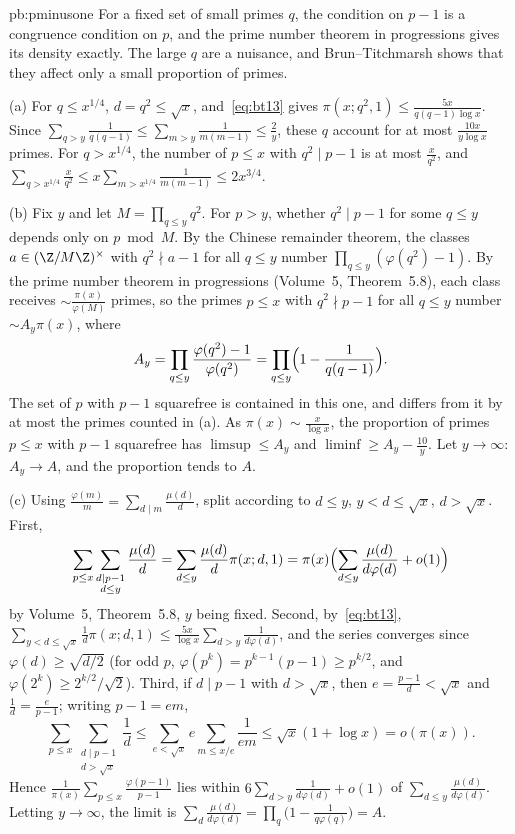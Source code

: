 \begin{solution}{pb:pminusone}
\idea For a fixed set of small primes $q$, the condition on $p-1$ is a congruence condition on $p$, and the prime number theorem in progressions gives its density exactly. The
large $q$ are a nuisance, and Brun--Titchmarsh shows that they affect only a small proportion of primes.

\writeup (a) For $q\le x^{1/4}$, $d=q^2\le\sqrt x$, and~\eqref{eq:bt13} gives $\pi(x;q^2,1)\le\frac{5x}{q(q-1)\log x}$. Since $\sum_{q>y}\frac1{q(q-1)}\le\sum_{m>y}\frac1{m(m-1)}\le\frac2y$, these $q$
account for at most $\frac{10x}{y\log x}$ primes. For $q>x^{1/4}$, the number of $p\le x$ with $q^2\mid p-1$ is at most $\frac x{q^2}$, and
$\sum_{q>x^{1/4}}\frac x{q^2}\le x\sum_{m>x^{1/4}}\frac1{m(m-1)}\le2x^{3/4}$.

(b) Fix $y$ and let $M=\prod_{q\le y}q^2$. For $p>y$, whether $q^2\mid p-1$ for some $q\le y$ depends only on $p\bmod M$. By the Chinese remainder theorem, the classes
$a\in(\Z/M\Z)^\times$ with $q^2\nmid a-1$ for all $q\le y$ number $\prod_{q\le y}(\varphi(q^2)-1)$. By the prime number theorem in progressions (Volume~5, Theorem~5.8), each class
receives $\sim\frac{\pi(x)}{\varphi(M)}$ primes, so the primes $p\le x$ with $q^2\nmid p-1$ for all $q\le y$ number $\sim A_y\pi(x)$, where
\[
A_y=\prod_{q\le y}\frac{\varphi(q^2)-1}{\varphi(q^2)}=\prod_{q\le y}\Bigl(1-\frac1{q(q-1)}\Bigr).
\]
The set of $p$ with $p-1$ squarefree is contained in this one, and differs from it by at most the primes counted in (a). As $\pi(x)\sim\frac x{\log x}$, the proportion of
primes $p\le x$ with $p-1$ squarefree has $\limsup\le A_y$ and $\liminf\ge A_y-\frac{10}y$. Let $y\to\infty$: $A_y\to A$, and the proportion tends to $A$.

(c) Using $\frac{\varphi(m)}m=\sum_{d\mid m}\frac{\mu(d)}d$, split according to $d\le y$, $y<d\le\sqrt x$, $d>\sqrt x$. First,
\[
\sum_{p\le x}\sum_{\substack{d\mid p-1\\d\le y}}\frac{\mu(d)}d=\sum_{d\le y}\frac{\mu(d)}d\pi(x;d,1)=\pi(x)\Bigl(\sum_{d\le y}\frac{\mu(d)}{d\varphi(d)}+o(1)\Bigr)
\]
by Volume~5, Theorem~5.8, $y$ being fixed. Second, by~\eqref{eq:bt13},
$\sum_{y<d\le\sqrt x}\frac1d\pi(x;d,1)\le\frac{5x}{\log x}\sum_{d>y}\frac1{d\varphi(d)}$, and the series converges since $\varphi(d)\ge\sqrt{d/2}$ (for odd $p$, $\varphi(p^k)=p^{k-1}(p-1)\ge p^{k/2}$, and
$\varphi(2^k)\ge2^{k/2}/\sqrt2$). Third, if $d\mid p-1$ with $d>\sqrt x$, then $e=\frac{p-1}d<\sqrt x$ and $\frac1d=\frac e{p-1}$; writing $p-1=em$,
\[
\sum_{p\le x}\sum_{\substack{d\mid p-1\\d>\sqrt x}}\frac1d\le\sum_{e<\sqrt x}e\sum_{m\le x/e}\frac1{em}\le\sqrt x(1+\log x)=o(\pi(x)).
\]
Hence $\frac1{\pi(x)}\sum_{p\le x}\frac{\varphi(p-1)}{p-1}$ lies within $6\sum_{d>y}\frac1{d\varphi(d)}+o(1)$ of $\sum_{d\le y}\frac{\mu(d)}{d\varphi(d)}$. Letting $y\to\infty$, the
limit is $\sum_d\frac{\mu(d)}{d\varphi(d)}=\prod_q\bigl(1-\frac1{q\varphi(q)}\bigr)=A$.


\end{solution}
